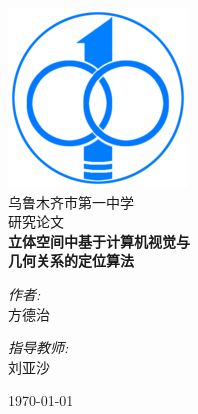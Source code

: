 \begin{titlepage}
\begin{center}
\includegraphics[scale=0.5]{./logo.png}\\[1cm] 
\textsc{\LARGE 乌鲁木齐市第一中学}\\[1.5cm]
\textsc{\Large 研究论文}\\[0.5cm]
{ \huge \bfseries 立体空间中基于计算机视觉与\\几何关系的定位算法}\\[5cm]


\begin{minipage}{0.4\textwidth}
\begin{flushleft} \large
\begin{center}
\emph{作者:}\\
方德治
\end{center}
\end{flushleft}
\end{minipage}
\begin{minipage}{0.4\textwidth}
\begin{flushright} \large
\begin{center}
\emph{指导教师:} \\
刘亚沙
\end{center}
\end{flushright}
\end{minipage}

\vfill

{\large \today}

\end{center}
\end{titlepage}